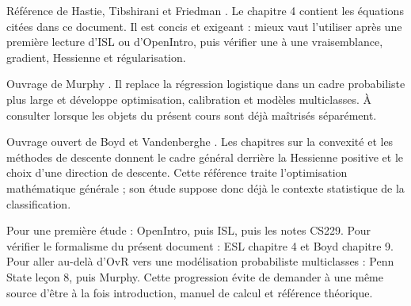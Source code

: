 \begin{description}[style=nextline,leftmargin=0pt]
  \item[\href{https://hastie.su.domains/ElemStatLearn/}{The Elements of
  Statistical Learning}] Référence de Hastie, Tibshirani et Friedman
  \cite{hastie2009}. Le chapitre 4 contient les équations citées dans ce document.
  Il est concis et exigeant : mieux vaut l'utiliser après une première lecture
  d'ISL ou d'OpenIntro, puis vérifier une à une vraisemblance, gradient, Hessienne
  et régularisation.

  \item[\href{https://probml.github.io/pml-book/book1.html}{Probabilistic Machine
  Learning: An Introduction}] Ouvrage de Murphy \cite{murphy2022}. Il replace la
  régression logistique dans un cadre probabiliste plus large et développe
  optimisation, calibration et modèles multiclasses. À consulter lorsque les
  objets du présent cours sont déjà maîtrisés séparément.

  \item[\href{https://web.stanford.edu/~boyd/cvxbook/}{Convex Optimization}]
  Ouvrage ouvert de Boyd et Vandenberghe \cite{boyd2004}. Les chapitres sur la
  convexité et les méthodes de descente donnent le cadre général derrière la
  Hessienne positive et le choix d'une direction de descente. Cette référence
  traite l'optimisation mathématique générale ; son étude suppose donc déjà le
  contexte statistique de la classification.
\end{description}

\begin{resultat}
Pour une première étude : OpenIntro, puis ISL, puis les notes CS229. Pour vérifier
le formalisme du présent document : ESL chapitre 4 et Boyd chapitre 9. Pour aller
au-delà d'OvR vers une modélisation probabiliste multiclasses : Penn State leçon
8, puis Murphy. Cette progression évite de demander à une même source d'être à la
fois introduction, manuel de calcul et référence théorique.
\end{resultat}

